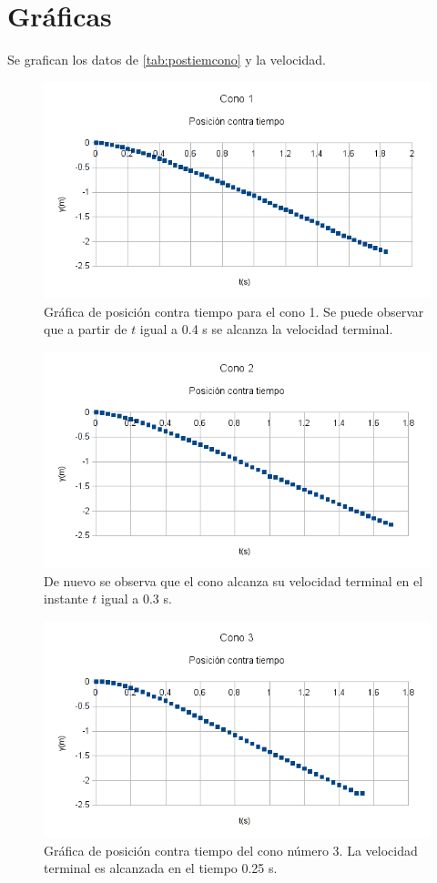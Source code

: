 \section{Gráficas}

Se grafican los datos de \ref{tab:postiemcono} y la velocidad.

\clearpage
\begin{figure}[h!]
    \centering
    \includegraphics{pos_time1}
    \caption{Gráfica de posición contra tiempo para el cono 1. Se puede 
    observar que a partir de $t$ igual a 0.4 s se alcanza la velocidad
    terminal.}
    \label{fig:posl_cono1}
\end{figure}

\begin{figure}[h!]
    \centering
    \includegraphics{pos_time2}
    \caption{De nuevo se observa que el cono alcanza su velocidad terminal en
    el instante $t$ igual a 0.3 s.}
    \label{fig:pos1_cono2}
\end{figure}

\begin{figure}[h!]
    \centering
    \includegraphics{pos_time3}
    \caption{Gráfica de posición contra tiempo del cono número 3.
    La velocidad terminal es alcanzada en el tiempo 0.25 s.}
    \label{fig:pos1_cono3}
\end{figure}
